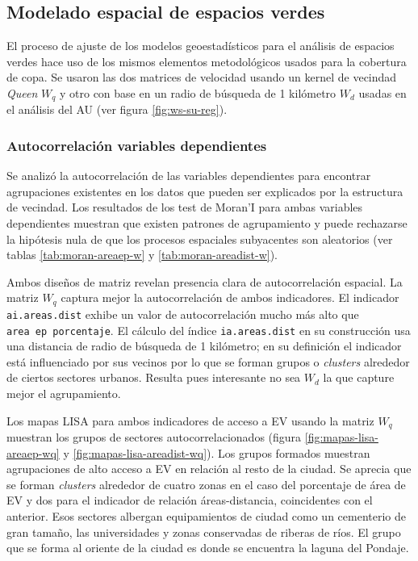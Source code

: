\documentclass[12pt,a4paper,openany]{book}
\theoremstyle{definition}
\theoremstyle{definition}
\theoremstyle{definition}
\theoremstyle{remark}
\begin{document}
\subsection{Modelado espacial de espacios
verdes}\label{modelado-espacial-de-espacios-verdes}

El proceso de ajuste de los modelos geoestadísticos para el análisis de
espacios verdes hace uso de los mismos elementos metodológicos usados
para la cobertura de copa. Se usaron las dos matrices de velocidad
usando un kernel de vecindad \emph{Queen} \(W_q\) y otro con base en un
radio de búsqueda de 1 kilómetro \(W_d\) usadas en el análisis del AU
(ver figura \ref{fig:ws-su-reg}).

\subsubsection{Autocorrelación variables
dependientes}\label{autocorrelacion-variables-dependientes-1}

Se analizó la autocorrelación de las variables dependientes para
encontrar agrupaciones existentes en los datos que pueden ser explicados
por la estructura de vecindad. Los resultados de los test de Moran'I
para ambas variables dependientes muestran que existen patrones de
agrupamiento y puede rechazarse la hipótesis nula de que los procesos
espaciales subyacentes son aleatorios (ver tablas
\ref{tab:moran-areaep-w} y \ref{tab:moran-areadist-w}).

Ambos diseños de matriz revelan presencia clara de autocorrelación
espacial. La matriz \(W_q\) captura mejor la autocorrelación de ambos
indicadores. El indicador \texttt{ai.areas.dist} exhibe un valor de
autocorrelación mucho más alto que \texttt{area\ ep\ porcentaje}. El
cálculo del índice \texttt{ia.areas.dist} en su construcción usa una
distancia de radio de búsqueda de 1 kilómetro; en su definición el
indicador está influenciado por sus vecinos por lo que se forman grupos
o \emph{clusters} alrededor de ciertos sectores urbanos. Resulta pues
interesante no sea \(W_d\) la que capture mejor el agrupamiento.

Los mapas LISA para ambos indicadores de acceso a EV usando la matriz
\(W_q\) muestran los grupos de sectores autocorrelacionados (figura
\ref{fig:mapas-lisa-areaep-wq} y \ref{fig:mapas-lisa-areadist-wq}). Los
grupos formados muestran agrupaciones de alto acceso a EV en relación al
resto de la ciudad. Se aprecia que se forman \emph{clusters} alrededor
de cuatro zonas en el caso del porcentaje de área de EV y dos para el
indicador de relación áreas-distancia, coincidentes con el anterior.
Esos sectores albergan equipamientos de ciudad como un cementerio de
gran tamaño, las universidades y zonas conservadas de riberas de ríos.
El grupo que se forma al oriente de la ciudad es donde se encuentra la
laguna del Pondaje.
\end{document}
